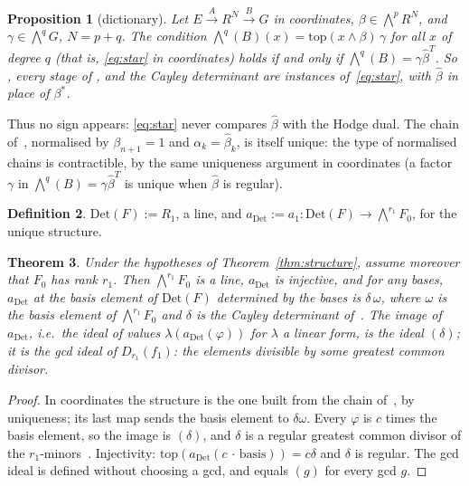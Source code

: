 \documentclass[11pt]{amsart}
\newtheorem{theorem}{Theorem}
\newtheorem{proposition}[theorem]{Proposition}
\theoremstyle{definition}
\newtheorem{definition}[theorem]{Definition}
\theoremstyle{remark}
\newcommand{\Det}{\mathrm{Det}}
\newcommand{\Ex}{{\textstyle\bigwedge}}
\begin{document}
\begin{proposition}[dictionary]\label{prop:dictionary}
Let $E\xrightarrow{A}R^N\xrightarrow{B}G$ in coordinates, $\beta\in\Ex^p
R^N$, and $\gamma\in\Ex^q G$, $N=p+q$.  The condition
$\Ex^q(B)(x)=\mathrm{top}(x\wedge\beta)\,\gamma$ for all $x$ of degree
$q$ (that is, \eqref{eq:star} in coordinates) holds if and only if
$\Ex^q(B)=\gamma\hat\beta^T$.  So \cite[Lemma~8.4]{CQ}, every stage of
\cite[Corollary~8.5]{CQ}, and the Cayley determinant are instances
of~\eqref{eq:star}, with $\hat\beta$ in place of $\beta^*$.
\end{proposition}

Thus no sign appears: \eqref{eq:star} never compares $\hat\beta$ with the
Hodge dual.  The chain of~\cite[Corollary~8.5]{CQ}, normalised by
$\beta_{n+1}=1$ and $\alpha_{k}=\hat\beta_{k}$, is itself unique: the
type of normalised chains is contractible, by the same uniqueness
argument in coordinates (a factor $\gamma$ in
$\Ex^q(B)=\gamma\hat\beta^T$ is unique when $\hat\beta$ is regular).

\begin{definition}
$\Det(F):=R_1$, a line, and $a_{\Det}:=a_1:\Det(F)\to\Ex^{r_1}F_0$, for
the unique structure.
\end{definition}

\begin{theorem}\label{thm:det}
Under the hypotheses of Theorem~\ref{thm:structure}, assume moreover that
$F_0$ has rank $r_1$.  Then $\Ex^{r_1}F_0$ is a line, $a_{\Det}$ is
injective, and for any bases, $a_{\Det}$ at the basis element of
$\Det(F)$ determined by the bases is $\delta\,\omega$, where $\omega$ is
the basis element of $\Ex^{r_1}F_0$ and $\delta$ is the Cayley
determinant of~\cite{CQ}.  The image of $a_{\Det}$, i.e.\ the ideal of
values $\lambda(a_{\Det}(\varphi))$ for $\lambda$ a linear form, is the
ideal $(\delta)$; it is the gcd ideal of $D_{r_1}(f_1)$: the elements
divisible by some greatest common divisor.
\end{theorem}

\begin{proof}
In coordinates the structure is the one built from the chain
of~\cite[Corollary~8.5]{CQ}, by uniqueness; its last map sends the basis
element to $\delta\omega$.  Every $\varphi$ is $c$ times the basis
element, so the image is $(\delta)$, and $\delta$ is a regular greatest
common divisor of the $r_1$-minors~\cite[Theorem~8.7]{CQ}.  Injectivity:
$\mathrm{top}(a_{\Det}(c\,\cdot\,\text{basis}))=c\delta$ and $\delta$
is regular.  The gcd ideal is defined without choosing a gcd, and
equals $(g)$ for every gcd $g$.
\end{proof}
\end{document}
